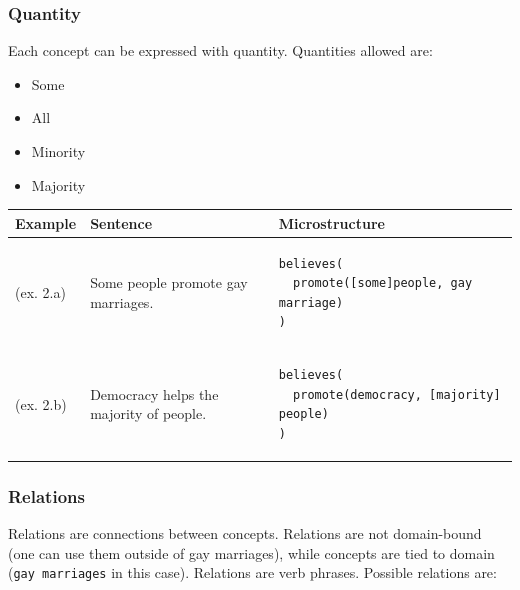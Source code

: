 \subsubsection*{Quantity}

Each concept can be expressed with quantity. Quantities allowed are:
\begin{itemize}
\item Some 
\item All
\item Minority
\item Majority
\end{itemize}

\begin{table}[!htb]
\begin{tabular}{@{}m{1.5cm} m{5cm} m{8cm}}
\toprule
Example & Sentence & Microstructure \\
\midrule
(ex. 2.a) & Some people promote gay marriages. & 
\begin{verbatim}
believes(
  promote([some]people, gay marriage)
) 
\end{verbatim}
\\
(ex. 2.b) &Democracy helps the majority of people. &
\begin{verbatim}
believes( 
  promote(democracy, [majority] people)
)
\end{verbatim} 
\\
\bottomrule
\end{tabular}
\end{table}

\subsubsection*{Relations}

Relations are connections between concepts. Relations are not domain-bound (one
can use them outside of gay marriages), while concepts are tied to domain 
(\texttt{gay marriages} in this case). Relations are verb phrases. 
Possible relations are:

